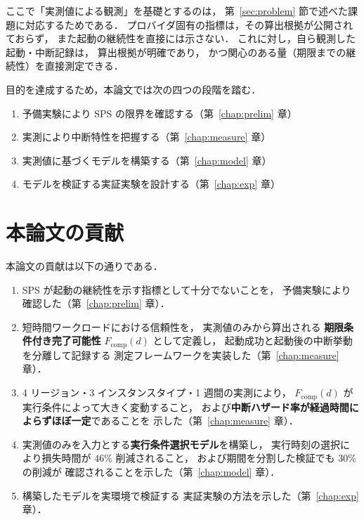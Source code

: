 \documentclass[11pt,a4paper]{ltjsreport}
\newcommand{\Fcomp}{F_{\mathrm{comp}}}
\begin{document}
ここで「実測値による観測」を基礎とするのは，
第~\ref{sec:problem} 節で述べた課題に対応するためである．
プロバイダ固有の指標は，その算出根拠が公開されておらず，
また起動の継続性を直接には示さない．
これに対し，自ら観測した起動・中断記録は，
算出根拠が明確であり，
かつ関心のある量（期限までの継続性）を直接測定できる．

目的を達成するため，本論文では次の四つの段階を踏む．

\begin{enumerate}
  \item 予備実験により SPS の限界を確認する（第~\ref{chap:prelim} 章）
  \item 実測により中断特性を把握する（第~\ref{chap:measure} 章）
  \item 実測値に基づくモデルを構築する（第~\ref{chap:model} 章）
  \item モデルを検証する実証実験を設計する（第~\ref{chap:exp} 章）
\end{enumerate}

\section{本論文の貢献}

本論文の貢献は以下の通りである．

\begin{enumerate}
  \item SPS が起動の継続性を示す指標として十分でないことを，
        予備実験により確認した（第~\ref{chap:prelim} 章）．
  \item 短時間ワークロードにおける信頼性を，
        実測値のみから算出される
        \textbf{期限条件付き完了可能性} $\Fcomp(d)$ として定義し，
        起動成功と起動後の中断挙動を分離して記録する
        測定フレームワークを実装した（第~\ref{chap:measure} 章）．
  \item 4 リージョン・3 インスタンスタイプ・1 週間の実測により，
        $\Fcomp(d)$ が実行条件によって大きく変動すること，
        および\textbf{中断ハザード率が経過時間によらずほぼ一定}であることを
        示した（第~\ref{chap:measure} 章）．
  \item 実測値のみを入力とする\textbf{実行条件選択モデル}を構築し，
        実行時刻の選択により損失時間が $46\%$ 削減されること，
        および期間を分割した検証でも $30\%$ の削減が
        確認されることを示した（第~\ref{chap:model} 章）．
  \item 構築したモデルを実環境で検証する
        実証実験の方法を示した（第~\ref{chap:exp} 章）．
\end{enumerate}
\end{document}
